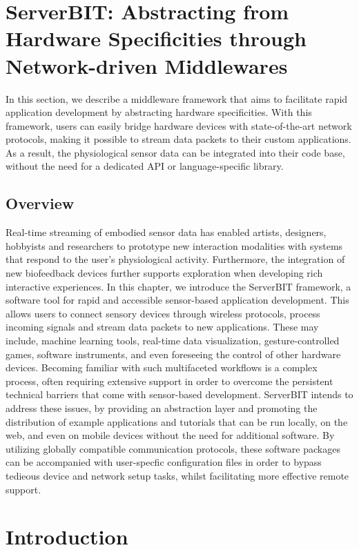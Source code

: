 \section{ServerBIT: Abstracting from Hardware Specificities through Network-driven Middlewares}

In this section, we describe a middleware framework that aims to facilitate rapid application development by abstracting hardware specificities. With this framework, users can easily bridge hardware devices with state-of-the-art network protocols, making it possible to stream data packets to their custom applications. As a result, the physiological sensor data can be integrated into their code base, without the need for a dedicated API or language-specific library.

\subsection{Overview}

Real-time streaming of embodied sensor data has enabled artists, designers, hobbyists and researchers to prototype new interaction modalities with systems that respond to the user’s physiological activity. Furthermore, the integration of new biofeedback devices further supports exploration when developing rich interactive experiences. In this chapter, we introduce the ServerBIT framework, a software tool for rapid and accessible sensor-based application development. This allows users to connect sensory devices through wireless protocols, process incoming signals and stream data packets to new applications. These may include, machine learning tools, real-time data visualization, gesture-controlled games, software instruments, and even foreseeing the control of other hardware devices. Becoming familiar with such multifaceted workflows is a complex process, often requiring extensive support in order to overcome the persistent technical barriers that come with sensor-based development. ServerBIT intends to address these issues, by providing an abstraction layer and promoting the distribution of example applications and tutorials that can be run locally, on the web, and even on mobile devices without the need for additional software. By utilizing globally compatible communication protocols, these software packages can be accompanied with user-specfic configuration files in order to bypass tedieous device and network setup tasks, whilst facilitating more effective remote support.

\section{Introduction}

